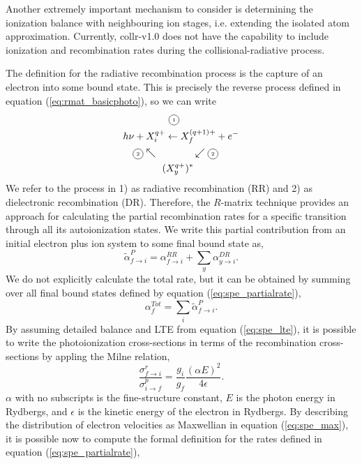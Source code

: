 Another extremely important mechanism to consider is determining the ionization balance with neighbouring ion stages, i.e. extending the isolated atom approximation. Currently, {\sc collr-v1.0} does not have the capability to include ionization and recombination rates during the collisional-radiative process.

The definition for the radiative recombination process is the capture of an electron into some bound state. This is precisely the reverse process defined in equation (\ref{eq:rmat_basicphoto}), so we can write
\begin{equation}\label{eq:rmat_basicre}
\begin{split}
& ~~~~~~~~~~~~~~ \tiny{\circled{1}}\\
& h\nu+ X_i^{q+} \leftarrow X_f^{(q+1)+} +e^-\\
& ~~~\tiny{\circled{2}}\nwarrow ~~~~~~~~~~~~~~~~~\swarrow \tiny{\circled{2}} \\
& ~~~~~~~~~~~~(X_y^{q+})^*
\end{split}
\end{equation}
We refer to the process in 1) as radiative recombination (RR) and 2) as dielectronic recombination (DR). Therefore, the $R$-matrix technique provides an approach for calculating the partial recombination rates for a specific transition through all its autoionization states. We write this partial contribution from an initial electron plus ion system to some final bound state as,
\begin{equation}\label{eq:spe_partialrate}
\tilde{\alpha}^{P}_{f\rightarrow i} = \alpha^{RR}_{f\rightarrow i} + \sum_y\alpha^{DR}_{y\rightarrow i}.
\end{equation}
We do not explicitly calculate the total rate, but it can be obtained by summing over all final bound states defined by equation (\ref{eq:spe_partialrate}),
\[
\alpha^{Tot}_f = \sum_i\tilde{\alpha}^{P}_{f\rightarrow i}.
\]
By assuming detailed balance and LTE from equation (\ref{eq:spe_lte}), it is possible to write the photoionization cross-sections in terms of the recombination cross-sections by appling the Milne relation,
\begin{equation}\label{eq:spe_milne}
\frac{\sigma^{r}_{f\rightarrow i}}{\sigma^p_{i\rightarrow f}}= \frac{g_i}{g_f}\frac{(\alpha E)^2}{4\epsilon}.
\end{equation}
$\alpha$ with no subscripts is the fine-structure constant, $E$ is the photon energy in Rydbergs, and $\epsilon$ is the kinetic energy of the electron in Rydbergs. By describing the distribution of electron velocities as Maxwellian in equation (\ref{eq:spe_max}), it is possible now to compute the formal definition for the rates defined in equation (\ref{eq:spe_partialrate}),
